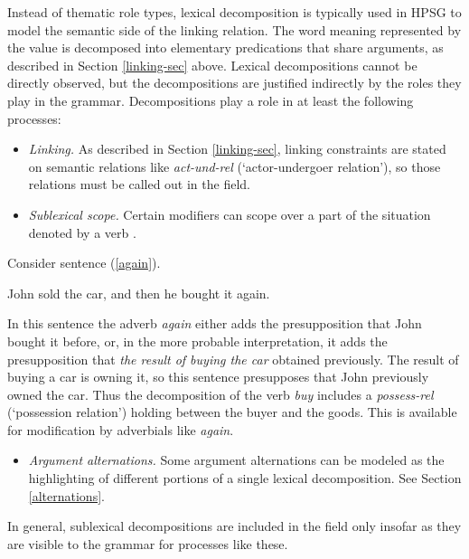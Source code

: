 \documentclass[output=paper
                ,modfonts
                ,nonflat
	        ,collection
	        ,collectionchapter
	        ,collectiontoclongg
 	        ,biblatex
                ,babelshorthands
                ,newtxmath
                ,draftmode
                ,colorlinks, citecolor=brown
]{./langsci/langscibook}
\begin{document}
Instead of thematic role types, lexical decomposition is typically used in HPSG to model the semantic side of the linking relation.  The word meaning represented by the \content value is decomposed into elementary predications that share arguments, as described in Section \ref{linking-sec} above.  Lexical decompositions cannot be directly observed, but the decompositions are justified indirectly by the roles they play in the grammar.  Decompositions play a role in at least the following processes:

\begin{itemize}
\item  \textit{Linking.}  As described in Section \ref{linking-sec}, linking constraints are stated on semantic relations like \textit{act-und-rel} (`actor-undergoer relation'), so those relations must be called out in the \content field.
\item \textit{Sublexical scope.}  Certain modifiers can scope over a part of the situation denoted by a verb \citep{Dowty:1979a}.  
\end{itemize}

Consider sentence (\ref{again}).

\begin{exe}
\ex \label{again} John sold the car, and then he bought it again.
\end{exe}

In this sentence the adverb \textit{again} either adds the presupposition that John bought it before, or, in the more probable interpretation, it adds the presupposition that \textit{the result of buying the car} obtained previously.  The result of buying a car is owning it, so this sentence presupposes that John previously owned the car. Thus the decomposition of the verb \textit{buy} includes a \textit{possess-rel} (`possession relation') holding between the buyer and the goods.  This is available for modification by adverbials like \textit{again}.

\begin{itemize}
\item \textit{Argument alternations.}  Some argument alternations can be modeled as the highlighting of different portions of a single lexical decomposition.  See Section \ref{alternations}.  
\end{itemize}  

\noindent
In general, sublexical decompositions are included in the \content field only insofar as they are visible to the grammar for processes like these.  
\end{document}
